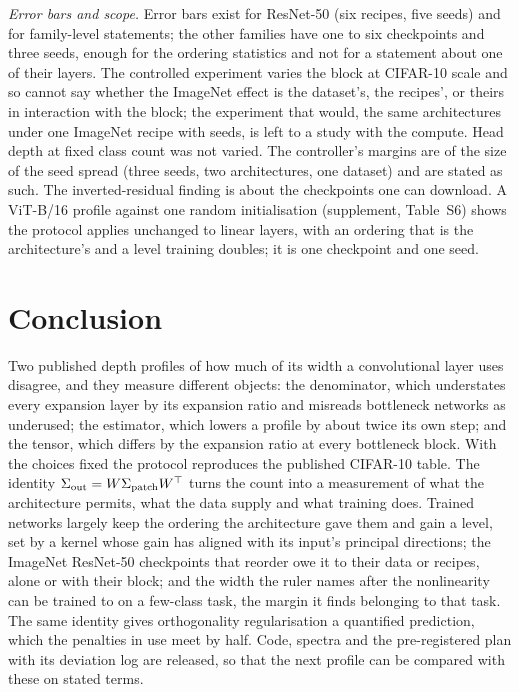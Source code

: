 \documentclass[10pt,journal,compsoc]{IEEEtran}
\begin{document}
\emph{Error bars and scope.} Error bars exist for ResNet-50 (six recipes,
five seeds) and for family-level statements; the other families have one
to six checkpoints and three seeds, enough for the ordering statistics
and not for a statement about one of their layers. The controlled
experiment varies the block at CIFAR-10 scale and so cannot say whether
the ImageNet effect is the dataset's, the recipes', or theirs in
interaction with the block; the experiment that would, the same
architectures under one ImageNet recipe with seeds, is left to a study
with the compute. Head depth at fixed class count was
not varied. The controller's margins are of the size of the seed spread
(three seeds, two architectures, one dataset) and are stated as such. The inverted-residual finding is about the checkpoints one
can download. A ViT-B/16 profile against one random initialisation
(supplement, Table~S6) shows the protocol applies unchanged to linear
layers, with an ordering that is the architecture's and a level training
doubles; it is one checkpoint and one seed.

\section{Conclusion}

Two published depth profiles of how much of its width a convolutional
layer uses disagree, and they measure different objects: the denominator,
which understates every expansion layer by its expansion ratio and
misreads bottleneck networks as underused; the estimator, which lowers a
profile by about twice its own step; and the tensor, which differs by the
expansion ratio at every bottleneck block. With the choices fixed the
protocol reproduces the published CIFAR-10 table. The identity
$\Sigma_{\rm out} = W\Sigma_{\rm patch}W^{\top}$ turns the count into a
measurement of what the architecture permits, what the data supply and
what training does. Trained networks largely keep the ordering the
architecture gave them and gain a level, set by a kernel whose gain has
aligned with its input's principal directions; the ImageNet ResNet-50
checkpoints that reorder owe it to their data or recipes, alone or with
their block; and the width the ruler names after the nonlinearity can be
trained to on a few-class task, the margin it finds belonging to that
task. The same identity gives orthogonality regularisation a quantified
prediction, which the penalties in use meet by half. Code, spectra and
the pre-registered plan with its deviation log are released, so that the
next profile can be compared with these on stated terms.
\end{document}
